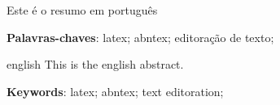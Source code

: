 
\setlength{\absparsep}{18pt} %
\begin{resumo}
    Este é o resumo em português
    
    \textbf{Palavras-chaves}: latex; abntex; editoração de texto;
\end{resumo}


\begin{resumo}[Abstract]

    \begin{otherlanguage*}{english}
        This is the english abstract.
        
        \vspace{\onelineskip}
        
        \noindent 
        \textbf{Keywords}: latex; abntex; text editoration;
    \end{otherlanguage*}
    
\end{resumo}